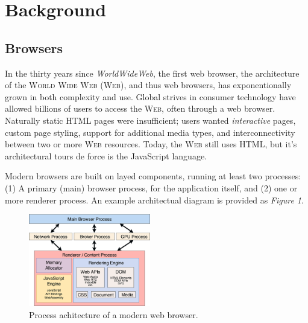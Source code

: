 \section{Background}
\setcounter{section}{1}

\subsection{Browsers}
In the thirty years since \textit{WorldWideWeb}\cite{berners-lee_www}, the first web browser,
the architecture of the \textsc{World Wide Web (Web)}, and thus web browsers, has exponentionally grown
in both complexity and use. Global strives in consumer technology have allowed billions\cite{browser-stats-world} of users to
access the \textsc{Web}, often through a web browser. Naturally static HTML pages were insufficient;
users wanted \textit{interactive} pages, custom page styling, support for additional media types,
and interconnectivity between two or more \textsc{Web} resources. Today, the \textsc{Web} still
uses HTML, but it's architectural tours de force is the JavaScript language\protect\footnotemark.
%

\noindent
Modern browsers are built on layed components, running at least two processes: (1) A
primary (main) browser process, for the application itself, and (2) one or more renderer
process. An example architectual diagram is provided as \textit{Figure 1}.%
\begin{figure}[!h]
    \begin{center}
        \includegraphics[width=0.475\textwidth]{./img/browser-process-architecture}
        \caption{Process achitecture of a modern web browser.}
    \end{center}
    \vspace{-4ex}
\end{figure}

